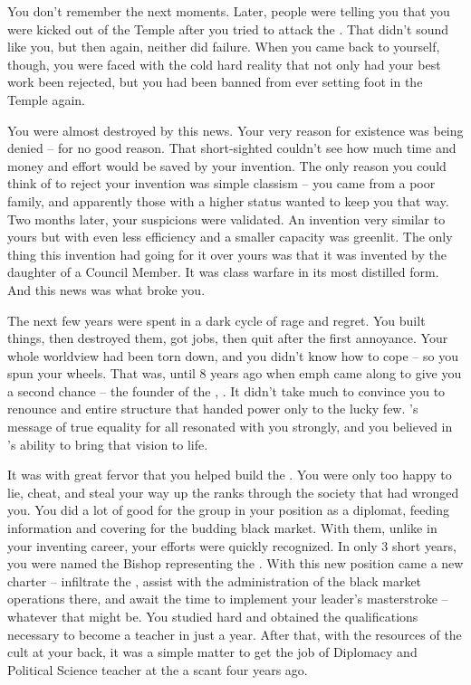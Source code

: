 \documentclass[char]{GL2020}
\begin{document}
You don’t remember the next moments. Later, people were telling you that you were kicked out of the Temple after you tried to attack the \cAntiChup{\cleric}. That didn’t sound like you, but then again, neither did failure. When you came back to yourself, though, you were faced with the cold hard reality that not only had your best work been rejected, but you had been banned from ever setting foot in the Temple again.

You were almost destroyed by this news. Your very reason for existence was being denied -- for no good reason. That short-sighted \cAntiChup{} couldn’t see how much time and money and effort would be saved by your invention. The only reason you could think of to reject your invention was simple classism -- you came from a poor family, and apparently those with a higher status wanted to keep you that way. Two months later, your suspicions were validated. An invention very similar to yours but with even less efficiency and a smaller capacity was greenlit. The only thing this invention had going for it over yours was that it was invented by the daughter of a Council Member. It was class warfare in its most distilled form. And this news was what broke you.

The next few years were spent in a dark cycle of rage and regret. You built things, then destroyed them, got jobs, then quit after the first annoyance. Your whole worldview had been torn down, and you didn’t know how to cope -- so you spun your wheels. That was, until 8 years ago when emph{\cChupLeader{\they}} came along to give you a second chance -- the founder of the \pGoaties{}, \cChupLeader{}. It didn’t take much to convince you to renounce \cTechGod{} and \cTechGod{\their} entire structure that handed power only to the lucky few. \cGenesis{}’s message of true equality for all resonated with you strongly, and you believed in \cChupLeader{}’s ability to bring that vision to life. 

It was with great fervor that you helped build the \pGoaties{}. You were only too happy to lie, cheat, and steal your way up the ranks through the society that had wronged you. You did a lot of good for the group in your position as a diplomat, feeding information and covering for the budding black market. With them, unlike in your inventing career, your efforts were quickly recognized. In only 3 short years, you were named the Bishop representing the \pTech{}. With this new position came a new charter -- infiltrate the \pSchool{}, assist with the administration of the black market operations there, and await the time to implement your leader’s masterstroke -- whatever that might be. You studied hard and obtained the qualifications necessary to become a teacher in just a year. After that, with the resources of the cult at your back, it was a simple matter to get the job of Diplomacy and Political Science teacher at the \pSc{} a scant four years ago.
\end{document}
